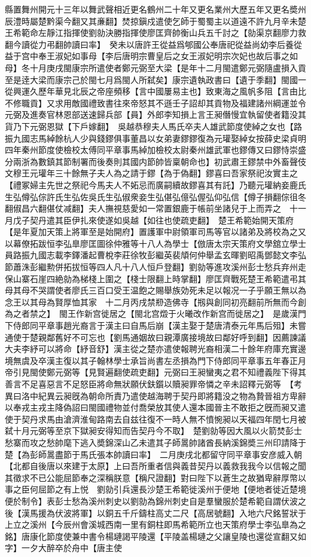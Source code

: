 縣置舞州開元十三年以舞武聲相近更名鶴州二十年又更名業州大歷五年又更名奬州辰澧時屬楚黔渠今翻又其亷翻】焚掠鎭戍遣使乞師于蜀蜀主以道遠不許九月辛未楚王希範命左靜江指揮使劉勍決勝指揮使廖匡齊帥衡山兵五千討之【勍渠京翻廖力救翻今讀從力弔翻帥讀曰率】　癸未以唐許王從益爲郇國公奉唐祀從益尚幼李后養從益于宫中奉王淑妃如事母【李后唐明宗曹皇后之女王淑妃明宗次妃也故后事之如母】冬十月庚戌閩康宗所遣使者鄭元弼至大梁【是年十二月閩遣鄭元弼隨盧損入貢至是逹大梁而康宗己於閩七月爲閩人所弑矣】康宗遺執政書曰【遺于季翻】閩國一從興運久歷年華見北辰之帝座頻移【言中國屢易主也】致東海之風帆多阻【言由比不修職貢】又求用敵國禮致書往來帝怒其不遜壬子詔却其貢物及福建諸州綱運並令元弼及進奏官林恩部送速歸兵部【員】外郎李知損上言王昶僭慢宜執留使者籍没其貨乃下元弼恩獄【下戶嫁翻】　吳越恭穆夫人馬氏卒夫人雄武節度使綽之女也【路振九國志馬綽餘杭人少與錢鏐俱事董昌以女弟妻鏐鏐復為元瓘娶綽女按薛史梁貞明四年秦州節度使檢校太傅同平章事馬綽加檢校太尉秦州雄武軍也鏐傳又曰鏐恃崇盛分兩浙為數鎮其節制署而後奏則其國内節帥皆稟朝命也】初武肅王鏐禁中外畜聲伎文穆王元瓘年三十餘無子夫人為之請于鏐【為于偽翻】鏐喜曰吾家祭祀汝實主之【禮冢婦主先世之祭祀今馬夫人不妬忌而廣嗣續故鏐喜其有託】乃聽元瓘納妾鹿氏生弘僔弘倧許氏生弘佐吳氏生弘俶衆妾生弘偡弘億弘偓弘仰弘信【僔子損翻倧徂冬翻俶昌六翻偡仗减翻】夫人撫視慈愛如一常置銀鹿于帳前坐諸兒于上而弄之　十一月戊子契丹遣其臣伊扎來使遂如吳越【如往也使疏吏翻】　楚王希範始開天策府【是年夏加天策上將軍至是始開府】置護軍中尉領軍司馬等官以諸弟及將校為之又以幕僚拓跋恒李弘臯廖匡圖徐仲雅等十八人為學士【倣唐太宗天策府文學舘立學士員路振九國志載李鐸潘起曹梲李莊徐牧彭繼英裴頏何仲舉孟玄暉劉昭禹鄧懿文李弘節蕭洙彭繼勲併拓拔恒等四人凡十八人恒戶登翻】劉勍等進攻溪州彭士愁兵弃州走保山寨石崖四絶勍為梯棧上圍之【棧士限翻上時掌翻】廖匡齊戰死楚王希範遣弔其母其母不哭謂使者廖氏三百口受王温飽之賜舉族効死未足以報况一子乎願王無以為念王以其母為賢厚恤其家　十二月丙戌禁剙造佛寺【剏與創同初亮翻前所無而今創為之者禁之】　閩王作新宫徙居之【閩北宫燬于火曦改作新宫而徙居之】　是歲漢門下侍郎同平章事趙光裔言于漢主曰自馬后崩【漢主娶于楚唐清泰元年馬后殂】未嘗通使于楚親鄰舊好不可忘也【劉馬通姻故曰親潭廣接境故曰鄰好呼到翻】因薦諫議大夫李紓可以將命【紓音舒】漢主從之楚亦遣使報聘光裔相漢二十餘年府庫充實邊境無虞及卒漢主復以其子翰林學士承旨尚書左丞損為門下侍郎同平章事五年春正月帝引見閩使鄭元弼等【見賢遍翻使疏吏翻】元弼曰王昶蠻夷之君不知禮義陛下得其善言不足喜惡言不足怒臣將命無狀願伏鈇鑕以贖昶罪帝憐之辛未詔釋元弼等　【考異曰洛中紀異云昶旣為朝命所責乃遣使越海聘于契丹即將籍没之物為贄晉祖方卑辭以奉戎主戎主降偽詔曰閩國禮物並付喬榮放其使人還本國晉主不敢拒之旣而昶又遣使于契丹求馬由滄濟淮甸路南去自兹往復不一時人無不憤惋昶以天福四年閏七月被弑十月元弼等至京下獄昶安得知而告契丹今不取】　楚劉勍等因大風以火箭焚彭士愁寨而攻之愁帥麾下逃入奬錦深山乙未遣其子師暠帥諸酋長納溪錦奬三州印請降于楚【為彭師暠盡節于馬氏張本帥讀曰率】　二月庚戌北都留守同平章事安彦威入朝【北都自後唐以來建于太原】上曰吾所重者信與義昔契丹以義救我我今以信報之聞其徵求不已公能屈節奉之深稱朕意【稱尺證翻】對曰陛下以蒼生之故猶卑辭厚幣以事之臣何屈節之有上悦　劉勍引兵還長沙楚王希範徙溪州于便地【便地者徙近楚境便於制令】表彭士愁為溪州刺史以劉勍為錦州刺史自是羣蠻服於楚希範自謂伏波之後【漢馬援為伏波將軍】以銅五千斤鑄柱高丈二尺【高居號翻】入地六尺銘誓狀于上立之溪州【今辰州會溪城西南一里有銅柱即馬希範所立也天策府學士李弘臯為之銘】唐康化節度使兼中書令楊璉謁平陵還【平陵盖楊璉之父讓皇陵也還從宣翻又如字】一夕大醉卒於舟中【唐主使